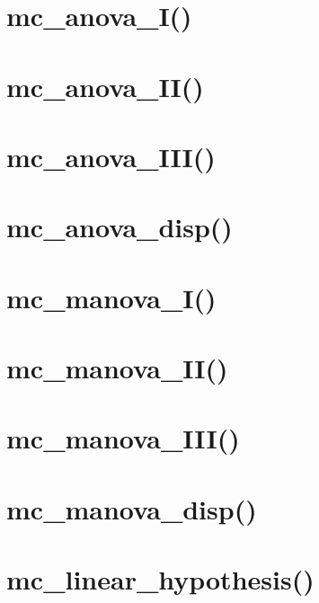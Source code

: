\section{mc\_anova\_I()}

\section{mc\_anova\_II()}

\section{mc\_anova\_III()}

\section{mc\_anova\_disp()}

\section{mc\_manova\_I()}

\section{mc\_manova\_II()}

\section{mc\_manova\_III()}

\section{mc\_manova\_disp()}

\section{mc\_linear\_hypothesis()}

